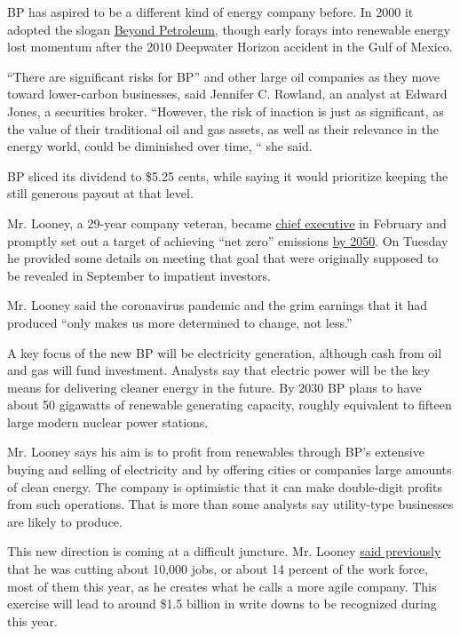 BP has aspired to be a different kind of energy company before. In 2000
it adopted the slogan
\href{https://www.nytimes3xbfgragh.onion/2002/12/08/magazine/how-green-is-bp.html}{Beyond
Petroleum}, though early forays into renewable energy lost momentum
after the 2010 Deepwater Horizon accident in the Gulf of Mexico.

``There are significant risks for BP'' and other large oil companies as
they move toward lower-carbon businesses, said Jennifer C. Rowland, an
analyst at Edward Jones, a securities broker. ``However, the risk of
inaction is just as significant, as the value of their traditional oil
and gas assets, as well as their relevance in the energy world, could be
diminished over time, `` she said.

BP sliced its dividend to \$5.25 cents, while saying it would prioritize
keeping the still generous payout at that level.

Mr. Looney, a 29-year company veteran, became
\href{https://www.nytimes3xbfgragh.onion/2019/10/04/business/bp-ceo-bob-dudley-bernard-looney.html}{chief
executive} in February and promptly set out a target of achieving ``net
zero'' emissions
\href{https://www.nytimes3xbfgragh.onion/2020/02/12/climate/bp-greenhouse-gas-emissions.html}{by
2050}. On Tuesday he provided some details on meeting that goal that
were originally supposed to be revealed in September to impatient
investors.

Mr. Looney said the coronavirus pandemic and the grim earnings that it
had produced ``only makes us more determined to change, not less.''

A key focus of the new BP will be electricity generation, although cash
from oil and gas will fund investment. Analysts say that electric power
will be the key means for delivering cleaner energy in the future. By
2030 BP plans to have about 50 gigawatts of renewable generating
capacity, roughly equivalent to fifteen large modern nuclear power
stations.

Mr. Looney says his aim is to profit from renewables through BP's
extensive buying and selling of electricity and by offering cities or
companies large amounts of clean energy. The company is optimistic that
it can make double-digit profits from such operations. That is more than
some analysts say utility-type businesses are likely to produce.

This new direction is coming at a difficult juncture. Mr. Looney
\href{https://www.bbc.com/news/explainers-52966609}{said previously}
that he was cutting about 10,000 jobs, or about 14 percent of the work
force, most of them this year, as he creates what he calls a more agile
company. This exercise will lead to around \$1.5 billion in write downs
to be recognized during this year.

